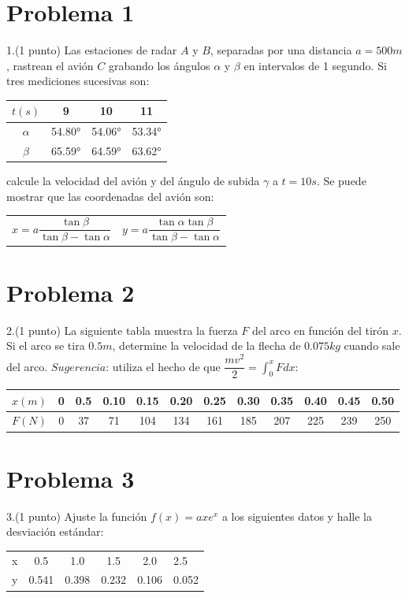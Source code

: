 \documentclass[12pt,oneside,FLEQN]{report}
\begin{document}
{	\section{Problema 1}
		1.(1 punto) Las estaciones de radar $A$ y $B$, separadas por una distancia $a=500m$, rastrean el avión $C$ grabando los ángulos $\alpha$ y $\beta$ en intervalos de 1 segundo. Si tres mediciones sucesivas son:\\
		\begin{center}
			\begin{tabular}{c|ccc}
				\hline
				$t(s)$&9&10&11\\
				\hline
				$\alpha$&54.80°&54.06°&53.34°\\
				$\beta$&65.59°&64.59°&63.62°\\
				\hline
			\end{tabular}
		\end{center}
		calcule la velocidad del avión y del ángulo de subida $\gamma$ a $t=10s$. Se puede mostrar que las coordenadas del avión son:
	\begin{center}
		\begin{tabular}{cc}
			$x=a\dfrac{\tan{\beta}}{\tan{\beta}-\tan{\alpha}}$\hfill&$y=a\dfrac{\tan{\alpha}\tan{\beta}}{\tan{\beta}-\tan{\alpha}}$\\
		\end{tabular}
	\end{center}
	\section{Problema 2}
	2.(1 punto) La siguiente tabla muestra la fuerza $F$ del arco en función del tirón $x$. Si el arco se tira $0.5m$, determine la velocidad de la flecha de $0.075kg$ cuando sale del arco. $Sugerencia$: utiliza el hecho de que $\dfrac{mv^{2}}{2}=\int_{0}^{x}Fdx$:
	\begin{center}
		{\small
		\begin{tabular}{c|ccccccccccc}
			\hline
			$x(m)$&0&0.5&0.10&0.15&0.20&0.25&0.30&0.35&0.40&0.45&0.50\\
			\hline
			$F(N)$&0&37&71&104&134&161&185&207&225&239&250\\
			\hline
		\end{tabular}
		}
	\end{center}
	\section{Problema 3}
	3.(1 punto) Ajuste la función $f(x)=axe^{x}$ a los siguientes datos y halle la desviación estándar:
	\begin{center}
		\begin{tabular}{c|cccc}
			\hline
			x&0.5&1.0&1.5&2.0&2.5\\
			y&0.541&0.398&0.232&0.106&0.052\\
		\end{tabular}
	\end{center}
}
\end{document}
